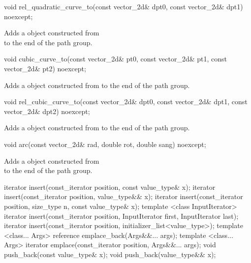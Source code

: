 %
\begin{itemdecl}
void rel_quadratic_curve_to(const vector_2d& dpt0, const vector_2d& dpt1)
  noexcept;
\end{itemdecl}
\begin{itemdescr}
\pnum
\effects
Adds a  object constructed from\\  to the end of the path group.
\end{itemdescr}

%
\begin{itemdecl}
void cubic_curve_to(const vector_2d& pt0, const vector_2d& pt1,
  const vector_2d& pt2) noexcept;
\end{itemdecl}
\begin{itemdescr}
\pnum
\effects
\pnum
Adds a  object constructed from  to the end of the path group.
\end{itemdescr}

%
\begin{itemdecl}
void rel_cubic_curve_to(const vector_2d& dpt0, const vector_2d& dpt1,
  const vector_2d& dpt2) noexcept;
\end{itemdecl}
\begin{itemdescr}
\pnum
\effects
Adds a  object constructed from  to the end of the path group.
\end{itemdescr}

%
\begin{itemdecl}
void arc(const vector_2d& rad, double rot, double sang) noexcept;
\end{itemdecl}
\begin{itemdescr}
\pnum
\effects
Adds a  object constructed from \\  to the end of the path group.
\end{itemdescr}

%
%
%
\begin{itemdecl}
iterator insert(const_iterator position, const value_type& x);
iterator insert(const_iterator position, value_type&& x);
iterator insert(const_iterator position, size_type n, const value_type& x);
template <class InputIterator>
iterator insert(const_iterator position, InputIterator first,
  InputIterator last);
iterator insert(const_iterator position, initializer_list<value_type>);
template <class... Args>
reference emplace_back(Args&&... args);
template <class... Args>
iterator emplace(const_iterator position, Args&&... args);
void push_back(const value_type& x);
void push_back(value_type&& x);
\end{itemdecl}

